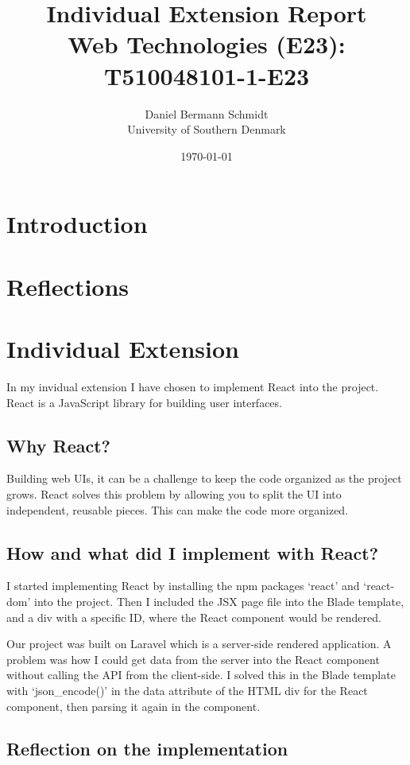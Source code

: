 \documentclass[letterpaper,twocolumn]{article}
\title{Individual Extension Report\\Web Technologies (E23): T510048101-1-E23}
\author{Daniel Bermann Schmidt\\University of Southern Denmark}
\date{\today}
\begin{document}
\maketitle

\section{Introduction}

\section{Reflections}

\section{Individual Extension}

In my invidual extension I have chosen to implement React into the project.
React is a JavaScript library for building user interfaces.

\subsection{Why React?}

Building web UIs, it can be a challenge to keep the code organized as the project grows.
React solves this problem by allowing you to split the UI into independent, reusable pieces.
This can make the code more organized.

\subsection{How and what did I implement with React?}

I started implementing React by installing the npm packages `react' and `react-dom' into the project.
Then I included the JSX page file into the Blade template, and a div with a specific ID, where the React component would be rendered.

Our project was built on Laravel which is a server-side rendered application.
A problem was how I could get data from the server into the React component without calling the API from the client-side.
I solved this in the Blade template with `json\_encode()' in the data attribute of the HTML div for the React component, then parsing it again in the component.

\subsection{Reflection on the implementation}
\end{document}

